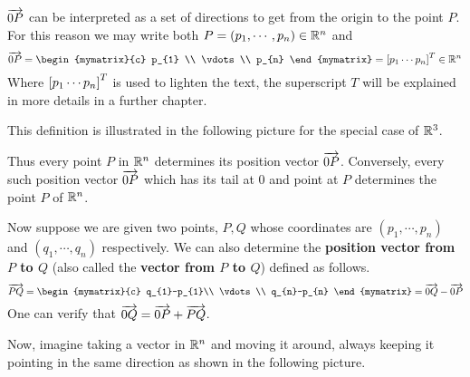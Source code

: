 $\overrightarrow{0P}$ can be interpreted as a set of directions to get from the origin to the point $P$.
For this reason we may write both $P=\left( p_{1},\cdots ,p_{n}\right)  \in \mathbb{R}^{n}$
and  $$\longvect{0P}= \begin{mymatrix}{c}
p_{1} \\
\vdots \\
p_{n}
\end{mymatrix} = \mat{p_{1} \cdots p_{n} }^T \in \R^{n}$$ 
Where $\left[p_{1} \cdots p_{n} \right]^T$ is used to lighten the text, the superscript $T$ will be explained in more details in a further chapter.

This definition is illustrated in the following picture for the
special case of $\mathbb{R}^{3}$.

\begin{center}
\end{center}

Thus every point $P$ in $\mathbb{R}^{n}$ determines its position
vector $\overrightarrow{0P}$. Conversely, every such position vector $\overrightarrow{0P}$
which has its tail at $0$ and point at $P$ determines the point $P$ of
$\mathbb{R}^{n}$.

Now suppose we are given two points, $P,Q$ whose
coordinates are $\left( p_{1},\cdots ,p_{n}\right) $ and $\left(
q_{1},\cdots ,q_{n}\right) $ respectively. We can also determine the
\textbf{position vector from $P$ to $Q$} (also called the \textbf{vector from $P$ to $Q$}) defined as follows.
\begin{equation*}
\longvect{PQ} = \begin{mymatrix}{c}
q_{1}-p_{1}\\
 \vdots \\
q_{n}-p_{n}
\end{mymatrix} = \longvect{0Q} - \longvect{0P}
\end{equation*}
One can verify that $\overrightarrow{0Q}=\overrightarrow{0P}+\overrightarrow{PQ}$.

Now, imagine taking a vector in $\mathbb{R}^n$ and moving it around, always
keeping it pointing in the same direction as shown in the following picture.

